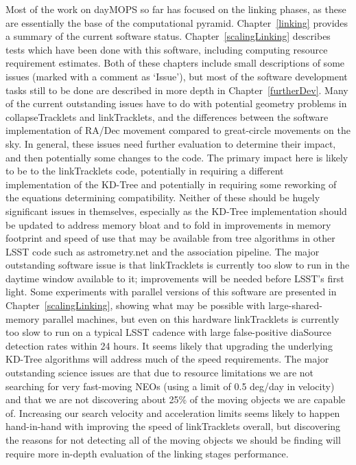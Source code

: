 Most of the work on dayMOPS so far has focused on the linking phases,
as these are essentially the base of the computational
pyramid. Chapter~\ref{linking} provides a summary of the current
software status. Chapter~\ref{scalingLinking} describes tests which have been done
with this software, including computing resource requirement
estimates. Both of these chapters include small descriptions of some
issues (marked with a comment as `Issue'), but most of the software
development tasks still to be done are described in more depth in
Chapter~\ref{furtherDev}. Many of the current outstanding issues
have to do with potential geometry problems in
collapseTracklets and linkTracklets, and the differences between the
software implementation of RA/Dec movement compared to great-circle
movements on the sky. In general, these issues need further evaluation
to determine their impact, and then potentially some changes to the
code. The primary impact here is likely to be to the linkTracklets
code, potentially in requiring a different implementation of the
KD-Tree and potentially in requiring some reworking of the equations
determining compatibility. Neither of these should be hugely significant issues
in themselves, especially as the KD-Tree implementation should be
updated to address memory bloat and to fold in improvements in memory
footprint and speed of use that may
be available from tree algorithms in other LSST code such as
astrometry.net and the association pipeline. The major
outstanding software issue is that linkTracklets is currently too slow to
run in the daytime window available to it; improvements will be needed
before LSST's first light. Some experiments with parallel versions of
this software are presented in Chapter~\ref{scalingLinking}, showing what may
be possible with large-shared-memory parallel machines, but even on
this hardware linkTracklets is currently too slow to run on a typical
LSST cadence with large false-positive diaSource detection rates
within 24 hours. It seems likely that upgrading the underlying KD-Tree
algorithms will address much of the speed requirements.  The major
outstanding science issues are that due to resource
limitations we are not searching for very fast-moving NEOs (using a
limit of 0.5 deg/day in velocity) and that we are not discovering
about 25\% of the moving objects we are capable of.  Increasing our
search velocity and acceleration limits seems likely to happen
hand-in-hand with improving the speed of linkTracklets overall, but
discovering the reasons for not detecting all of the moving objects we
should be finding will require more in-depth evaluation of the linking
stages performance. 

